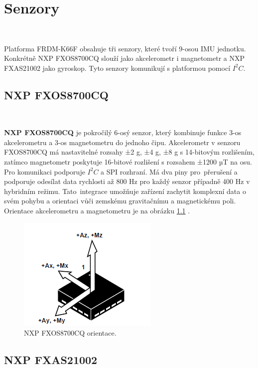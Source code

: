 \chapter{Senzory}
\label{sec:Sensors}
\vspace{-20pt}
\

Platforma FRDM-K66F obsahuje tři senzory, které tvoří
9-osou IMU jednotku. Konkrétně NXP FXOS8700CQ slouží jako akcelerometr i magnetometr a NXP FXAS21002 jako gyroskop. Tyto senzory komunikují s platformou pomocí $I^2C$\cite{frdmk66UserGuide}.

\section{NXP FXOS8700CQ}\

\textbf{NXP FXOS8700CQ} je pokročilý 6-osý senzor,
který kombinuje funkce 3-os akcelerometru
a 3-os magnetometru do jednoho čipu. Akcelerometr v senzoru FXOS8700CQ má
nastavitelné rozsahy ±2 g, ±4 g, ±8 g s 14-bitovým rozlišením, zatímco magnetometr
poskytuje 16-bitové rozlišení s rozsahem ±1200 µT na osu. Pro komunikaci podporuje
$I^2C$ a SPI rozhraní. Má dva piny pro~přerušení a podporuje odesílat data rychlosti
až 800 Hz pro každý senzor případně 400 Hz v hybridním režimu.
Tato~integrace umožňuje zařízení zachytit komplexní data o svém pohybu a
orientaci vůči zemskému gravitačnímu a magnetickému poli.
Orientace akcelerometru a magnetometru je na obrázku \ref{fig:FXOS_Orientation}
\cite{FXOS8700CQ}.

\begin{figure}[!h]
    \centering
    \includegraphics[width = 0.5\linewidth]{Figures/FXOS_Orientation.png}
    \caption{NXP FXOS8700CQ orientace\cite{FXOS8700CQ}.}
    \label{fig:FXOS_Orientation}
\end{figure}

\section{NXP FXAS21002}\

